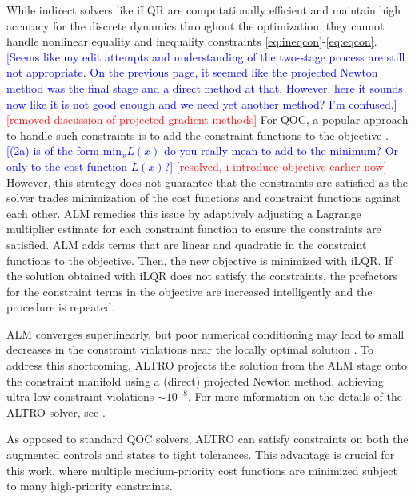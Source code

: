 While indirect solvers like iLQR are computationally
efficient and maintain high accuracy for the discrete dynamics
throughout the optimization, they cannot handle
nonlinear equality and inequality
constraints \eqref{eq:ineqcon}-\eqref{eq:eqcon}.
\textcolor{blue}{[Seems like my edit attempts and understanding
    of the two-stage process are still not appropriate.
    On the previous page, it seemed like the projected Newton
    method was the final stage and a direct method at that.
    However, here it sounds now like it is not good enough
    and we need yet another method? I'm confused.]}
\textcolor{red}{[removed discussion of projected gradient methods]}
For QOC, a popular approach to handle such constraints
is to add the constraint functions to the objective
\cite{heeres2017implementing, leung2017speedup, reinhold2019controlling}.
\textcolor{blue}{[(2a) is of the form $\text{min}_x L(x)$
    do you really mean to add to the minimum? Or only to the cost function $L(x)$?]}
\textcolor{red}{[resolved, i introduce objective earlier now]}
However, this strategy does not guarantee that the constraints
are satisfied as the solver trades
minimization of the cost functions and constraint functions against each other.
ALM remedies this issue by adaptively adjusting a Lagrange multiplier estimate
for each constraint function to ensure the constraints are satisfied.
ALM adds terms that are linear and quadratic in the constraint functions
to the objective. Then, the new objective is minimized with
iLQR. If the solution obtained with iLQR does not satisfy the constraints,
the prefactors for the constraint terms in the objective are increased
intelligently and the procedure is repeated.

ALM converges superlinearly, but poor numerical conditioning may lead
to small decreases in the constraint violations near the locally optimal solution
\cite{bertsekas1996constrained}.
To address this shortcoming, ALTRO
projects the solution from the ALM stage onto the constraint manifold using
a (direct) projected Newton method, achieving ultra-low
constraint violations $\sim 10^{-8}$.
For more information on the details of the ALTRO
solver, see \cite{howell2019altro, Jackson2020altroc}.

As opposed to standard QOC solvers, ALTRO
can satisfy constraints
on both the augmented controls and states to tight tolerances.
This advantage is crucial for this work, where multiple medium-priority cost functions
are minimized subject to many high-priority constraints.
